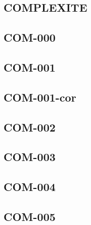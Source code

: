 \begin{multicols}{2}

\section*{COMPLEXITE}
\newcommand{\xxexo}{COM-000}
\subsection*{\xxexo}
\graphicspath{{../../exos/complexite/\xxexo/}}


\renewcommand{\xxexo}{COM-001}
\subsection*{\xxexo}
\graphicspath{{../../exos/complexite/\xxexo/}}


\renewcommand{\xxexo}{COM-001-cor}
\subsection*{\xxexo}
\graphicspath{{../../exos/complexite/\xxexo/}}



\renewcommand{\xxexo}{COM-002}
\subsection*{\xxexo}
\graphicspath{{../../exos/complexite/\xxexo/}}


\renewcommand{\xxexo}{COM-003}
\subsection*{\xxexo}
\graphicspath{{../../exos/complexite/\xxexo/}}


\renewcommand{\xxexo}{COM-004}
\subsection*{\xxexo}
\graphicspath{{../../exos/complexite/\xxexo/}}


\renewcommand{\xxexo}{COM-005}
\subsection*{\xxexo}
\graphicspath{{../../exos/complexite/\xxexo/}}



\end{multicols}

